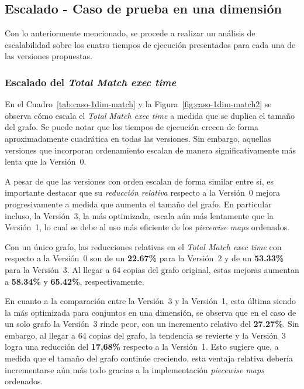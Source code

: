 \subsection{Escalado - Caso de prueba en una dimensión}

Con lo anteriormente mencionado, se procede a realizar un análisis de escalabilidad sobre los cuatro tiempos de ejecución presentados para cada una de las versiones propuestas.


\subsubsection{Escalado del \textit{Total Match exec time}}

En el Cuadro~\ref{tab:caso-1dim-match}
y la Figura~\ref{fig:caso-1dim-match2} se observa cómo escala el \textit{Total Match exec time} a medida que se duplica el tamaño del grafo. Se puede notar que los tiempos de ejecución crecen de forma aproximadamente cuadrática en todas las versiones. Sin embargo, aquellas versiones que incorporan ordenamiento escalan de manera significativamente más lenta que la Versión~0.

A pesar de que las versiones con orden escalan de forma similar entre sí, es importante destacar que su \textit{reducción relativa} respecto a la Versión~0 mejora progresivamente a medida que aumenta el tamaño del grafo. En particular incluso, la Versión~3, la más optimizada, escala aún más lentamente que la Versión~1, lo cual se debe al uso más eficiente de los \textit{piecewise maps} ordenados.

Con un único grafo, las reducciones relativas en el \textit{Total Match exec time} con respecto a la Versión~0 son de un \textbf{22{.}67\%} para la Versión~2 y de un \textbf{53{.}33\%} para la Versión~3. Al llegar a 64 copias del grafo original, estas mejoras aumentan a \textbf{58{.}34\%} y \textbf{65{.}42\%}, respectivamente.

En cuanto a la comparación entre la Versión~3 y la Versión~1, esta última siendo la más optimizada para conjuntos en una dimensión, se observa que en el caso de un solo grafo la Versión~3 rinde peor, con un incremento relativo del \textbf{27{.}27\%}. Sin embargo, al llegar a 64 copias del grafo, la tendencia se revierte y la Versión~3 logra una reducción del \textbf{17{,}68\%} respecto a la Versión~1. Esto sugiere que, a medida que el tamaño del grafo continúe creciendo, esta ventaja relativa debería incrementarse aún más todo gracias a la implementación \textit{piecewise maps} ordenados.


